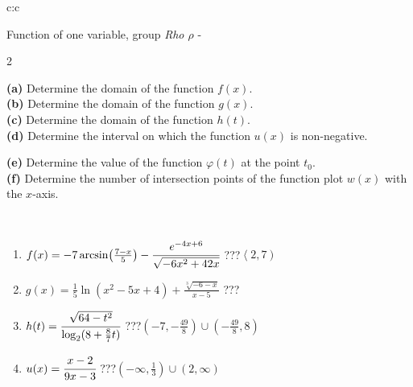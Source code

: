 \documentclass[10pt]{report}
\begin{document}
\begin{tabular}{c:c}
\begin{minipage}[c][104.5mm][t]{0.5\linewidth}
\begin{center}
\vspace{7mm}
{\huge Function of one variable, group \textit{Rho $\rho$} -}\\[5mm]
\begin{minipage}{0.95\linewidth}
\begin{center}
{\small \begin{multicols}{2} \raggedright
\textbf{(a)} Determine the domain of the function \(f(x)\). \\[1mm]
\textbf{(b)} Determine the domain of the function \(g(x)\). \\[1mm]
\textbf{(c)} Determine the domain of the function \(h(t)\). \\[1mm]
\textbf{(d)} Determine the interval on which the function \(u(x)\) is non-negative. \par \columnbreak
\textbf{(e)} Determine the value of the function \(\varphi(t)\) at the point \(t_0\). \\[1mm]
\textbf{(f)} Determine the number of intersection points of the function plot \(w(x)\) with the \(x\)-axis. \\[1mm]
\end{multicols}
}
\end{center}
\end{minipage}
\\[4mm]
\begin{minipage}{0.79\linewidth}
\begin{center}
\begin{varwidth}{\linewidth}
\begin{enumerate}
\small
\item $f(x) = -7\arcsin\!\left( \frac{7-x}{5} \right) - \cfrac{e^{-4x+6}}{\sqrt{-6x^2+42x}}$\quad \dotfill\; ???\;\dotfill \quad $\left\langle2 , 7\right)$
\item $g(x) = \frac{1}{5} \ln{\!(x^2-5x+4)}+\frac{\sqrt[3]{-6-x}}{x-5}$\quad \dotfill\; ???\;\dotfill {}
\item $h(t) = \cfrac{\sqrt{64-t^2}}{\log_2(8+\frac{8}{7}t)}$\quad \dotfill\; ???\;\dotfill \quad $\left(-7 , -\frac{49}{8}\right)\cup\left(-\frac{49}{8} , 8\right)$
\item $u(x) = \cfrac{x-2}{9x-3}$\quad \dotfill\; ???\;\dotfill \quad $\left(-\infty , \frac{1}{3}\right)\cup\left(2 , \infty\right)$

\end{enumerate}
\end{varwidth}
\end{center}
\end{minipage}
\end{center}
\end{minipage}
\end{tabular}
\end{document}
